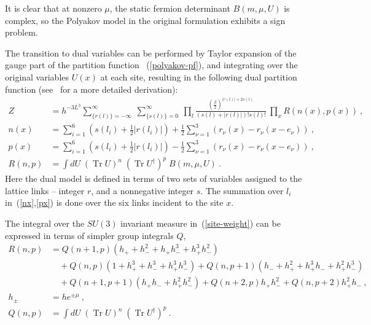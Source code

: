 \documentclass[a4paper,11pt]{article}
\DeclareMathOperator{\TR}{Tr}
\begin{document}
It is clear that at nonzero $\mu$, the static fermion determinant
$B(m, \mu, U)$ is complex, so the Polyakov model in the original formulation exhibits a sign problem. 

The transition to dual variables can be performed by 
Taylor expansion of the gauge part of the partition function ~(\ref{polyakov-pf}), and integrating over the original 
variables $U(x)$ at each site, resulting in the following dual
partition function (see~\cite{dual-polyakov} for a more detailed derivation):
\begin{align} 
\label{dual_PF}
	Z &= h^{-3 L^3} \sum_{\{ r(l) \} = -\infty}^{\infty} 
	\ \sum_{\{ s(l) \}= 0}^{\infty} \ 
	\prod_l  
	\frac{\left ( \frac{\beta}{2} \right )^{|r(l)| + 2s(l)}}{(s(l)+|r(l)|)!
		s(l)!} \ 
	\prod_x R(n(x),p(x))  \ , \\
	\label{nx}
	n(x) &=  \sum_{i=1}^{6}  \left ( s(l_i) + \frac{1}{2} | r(l_i) | \right )
	+ \frac{1}{2} \sum_{\nu=1}^{3} \left ( r_{\nu}(x) - r_{\nu}(x-e_{\nu}) \right )
	\ ,   \\ 
	\label{px}
	p(x) &=  \sum_{i=1}^{6}  \left ( s(l_i) + \frac{1}{2} | r(l_i) | \right )
	- \frac{1}{2} \sum_{\nu=1}^{3} \left ( r_{\nu}(x) - r_{\nu}(x-e_{\nu}) \right )
	\ , \\
	\label{site-weight}
	R(n, p) &= \int dU \; 
	\left(\TR U\right)^n \;
	\left(\TR U^\dagger\right)^p \; 
	B(m, \mu, U) \ .
\end{align}
Here the dual model is defined in terms of two sets of 
variables assigned to the lattice links -- integer 
$r$, and a nonnegative integer $s$. 
The summation over $l_i$ in~(\ref{nx},\ref{px}) 
is done over the six links incident to 
the site $x$.

The integral over the $SU(3)$ invariant measure in~(\ref{site-weight}) can be expressed in terms of simpler group integrals $Q$,
\begin{align}
\label{site-weight-Q}
R(n,p) &= Q(n+1,p) \left ( h_+ + h_-^2 + h_+ h_-^3 + h_+^3 h_-^2  \right ) \\
	& \quad + Q(n,p) \left ( 1+ h_+^3 + h_-^3 + h_+^3 h_-^3  \right )  + 
	Q(n,p+1) \left ( h_- + h_+^2 + h_+^3 h_- + h_+^2 h_-^3  \right )   \nonumber \\ 
	& \quad + Q(n+1,p+1) \left ( h_+ h_- + h_+^2 h_-^2  \right ) + 
	Q(n+2,p) h_+ h_-^2  + Q(n,p+2) h_+^2 h_- \ ,   \nonumber  
	\\
h_{\pm} &= h e^{\pm \mu} \ , \\
Q(n, p) &= \int dU \; \left(\TR U\right)^n \;
	\left(\TR U^\dagger\right)^p \ .
\end{align}
\end{document}
